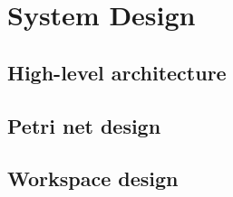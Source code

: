 \documentclass[../Dissertation.tex]{subfiles}
\begin{document}
\section{System Design}
\subsection{High-level architecture}
\subsection{Petri net design}
\subsection{Workspace design}
\end{document}
